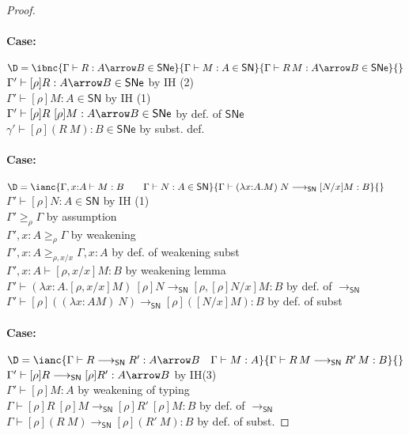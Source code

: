 \documentclass{article}
\newcommand{\ext}[1]{\geq_{#1}}
\newcommand{\SN}{\mathsf{SN}}
\newcommand{\SNe}{\mathsf{SNe}}
\newcommand{\redSN}{\longrightarrow_\SN}
\begin{document}
\begin{proof}
\paragraph{Case:} $\D = \ibnc{\Gamma \vdash R : A \arrow B \in \SNe}{\Gamma \vdash M : A \in \SN}{\Gamma \vdash R\,M : A \arrow B \in \SNe}{} $
\\[1em]
$\Gamma' \vdash [\rho]R : A \arrow B \in \SNe$ \hfill by IH (2) \\
$\Gamma' \vdash [\rho]M : A \in \SN$ \hfill by IH (1) \\
$\Gamma' \vdash [\rho]R~[\rho]M : A \arrow B \in \SNe$ \hfill by def. of $\SNe$\\
$\gamma' \vdash [\rho](R~M) : B \in \SNe$ \hfill by subst. def.

\paragraph{Case:}$\D = \ianc{\Gamma, x{:}A \vdash M : B \qquad \Gamma \vdash N : A \in \SN}{\Gamma \vdash (\lambda x{:}A.M)\;N \redSN [N/x]M : B}{} \qquad$
\\[1em]
$\Gamma' \vdash [\rho]N : A\in \SN$ \hfill by IH (1) \\
$\Gamma' \ext{\rho} \Gamma$ \hfill by assumption \\
$\Gamma', x{:}A \ext{\rho} \Gamma$ \hfill by weakening\\
$\Gamma', x{:}A \ext{\rho, x/x} \Gamma, x{:}A$ \hfill by def. of weakening subst\\
$\Gamma', x{:}A \vdash [\rho, x/x]M : B$ \hfill by weakening lemma \\
$\Gamma' \vdash (\lambda x{:}A.[\rho, x/x]M)~[\rho]N \redSN [\rho, [\rho]N/x]M : B$ \hfill by def. of $\redSN$\\
$\Gamma' \vdash [\rho]((\lambda x{:}A M)~N) \redSN [\rho]([N/x]M) : B$ \hfill by def. of subst

\paragraph{Case:}$\D = \ianc{\Gamma \vdash R \redSN R' : A \arrow B \quad \Gamma \vdash M : A}{\Gamma \vdash R\,M \redSN R'\,M : B}{}$\\[1em]
$\Gamma' \vdash [\rho]R \redSN [\rho]R': A \arrow B$ \hfill by IH(3) \\
$\Gamma' \vdash [\rho]M : A$ \hfill by weakening of typing \\
$\Gamma \vdash [\rho]R~[\rho]M \redSN [\rho]R'~[\rho]M : B$ \hfill by def. of $\redSN$\\
$\Gamma \vdash [\rho](R~M) \redSN [\rho](R'~M) : B$ \hfill by def. of subst.

\end{proof}
\end{document}
